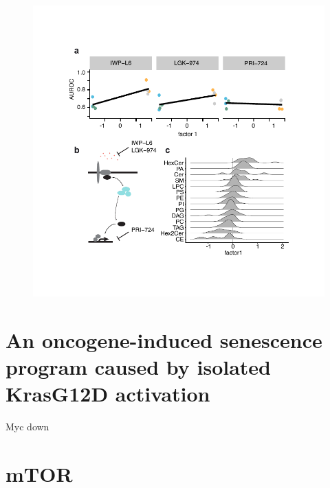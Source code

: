 \begin{flushleft}
\begin{figure}[h]
\centering
\includegraphics[width=\textwidth,
                height=\textheight,
                keepaspectratio]{figures/adenomaprofiling/pdf/fig_2_2.pdf}
\caption{}
\label{fig_199}
\end{figure}
\bigbreak

\section{An oncogene-induced senescence program caused by isolated KrasG12D activation}
Myc down


\section{mTOR}



\end{flushleft}
